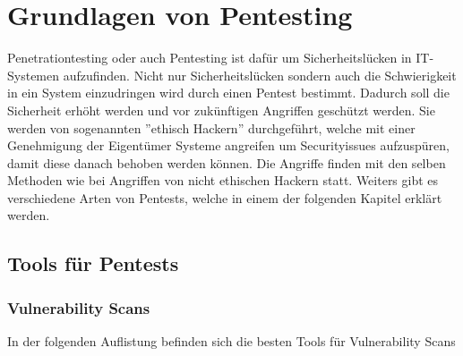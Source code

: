 \section{Grundlagen von Pentesting}

Penetrationtesting oder auch Pentesting ist dafür um Sicherheitslücken in IT-Systemen aufzufinden. Nicht nur Sicherheitslücken sondern auch die Schwierigkeit in ein System einzudringen wird durch einen Pentest bestimmt. Dadurch soll die Sicherheit erhöht werden und vor zukünftigen Angriffen geschützt werden. Sie werden von sogenannten ''ethisch Hackern'' durchgeführt, welche mit einer Genehmigung der Eigentümer Systeme angreifen um Securityissues aufzuspüren, damit diese danach behoben werden können. Die Angriffe finden mit den selben Methoden wie bei Angriffen von nicht ethischen Hackern statt. Weiters gibt es verschiedene Arten von Pentests, welche in einem der folgenden Kapitel erklärt werden.

\subsection{Tools für Pentests}

\subsubsection{Vulnerability Scans}

In der folgenden Auflistung befinden sich die besten Tools für Vulnerability Scans

